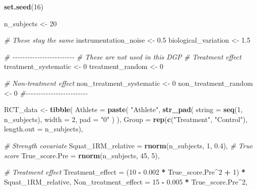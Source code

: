 \documentclass[
]{book}
\newenvironment{Shaded}{\begin{snugshade}}{\end{snugshade}}
\newcommand{\CommentTok}[1]{\textcolor[rgb]{0.56,0.35,0.01}{\textit{#1}}}
\newcommand{\DataTypeTok}[1]{\textcolor[rgb]{0.13,0.29,0.53}{#1}}
\newcommand{\DecValTok}[1]{\textcolor[rgb]{0.00,0.00,0.81}{#1}}
\newcommand{\FloatTok}[1]{\textcolor[rgb]{0.00,0.00,0.81}{#1}}
\newcommand{\KeywordTok}[1]{\textcolor[rgb]{0.13,0.29,0.53}{\textbf{#1}}}
\newcommand{\NormalTok}[1]{#1}
\newcommand{\OperatorTok}[1]{\textcolor[rgb]{0.81,0.36,0.00}{\textbf{#1}}}
\newcommand{\StringTok}[1]{\textcolor[rgb]{0.31,0.60,0.02}{#1}}
\begin{document}
\begin{Shaded}
\begin{Highlighting}[]
\KeywordTok{set.seed}\NormalTok{(}\DecValTok{16}\NormalTok{)}

\NormalTok{n\_subjects <{-}}\StringTok{ }\DecValTok{20}

\CommentTok{\# These stay the same}
\NormalTok{instrumentation\_noise <{-}}\StringTok{ }\FloatTok{0.5}
\NormalTok{biological\_variation <{-}}\StringTok{ }\FloatTok{1.5}

\CommentTok{\# {-}{-}{-}{-}{-}{-}{-}{-}{-}{-}{-}{-}{-}{-}{-}{-}{-}{-}{-}{-}{-}{-}{-}{-}{-}}
\CommentTok{\# These are not used in this DGP}
\CommentTok{\# Treatment effect}
\NormalTok{treatment\_systematic <{-}}\StringTok{ }\DecValTok{0}
\NormalTok{treatment\_random <{-}}\StringTok{ }\DecValTok{0}

\CommentTok{\# Non{-}treatment effect}
\NormalTok{non\_treatment\_systematic <{-}}\StringTok{ }\DecValTok{0}
\NormalTok{non\_treatment\_random <{-}}\StringTok{ }\DecValTok{0}
\CommentTok{\#{-}{-}{-}{-}{-}{-}{-}{-}{-}{-}{-}{-}{-}{-}{-}{-}{-}{-}{-}{-}{-}{-}{-}{-}{-}}

\NormalTok{RCT\_data <{-}}\StringTok{ }\KeywordTok{tibble}\NormalTok{(}
  \DataTypeTok{Athlete =} \KeywordTok{paste}\NormalTok{(}
    \StringTok{"Athlete"}\NormalTok{,}
    \KeywordTok{str\_pad}\NormalTok{(}
      \DataTypeTok{string =} \KeywordTok{seq}\NormalTok{(}\DecValTok{1}\NormalTok{, n\_subjects),}
      \DataTypeTok{width =} \DecValTok{2}\NormalTok{,}
      \DataTypeTok{pad =} \StringTok{"0"}
\NormalTok{    )}
\NormalTok{  ),}
  \DataTypeTok{Group =} \KeywordTok{rep}\NormalTok{(}\KeywordTok{c}\NormalTok{(}\StringTok{"Treatment"}\NormalTok{, }\StringTok{"Control"}\NormalTok{), }\DataTypeTok{length.out =}\NormalTok{ n\_subjects),}

  \CommentTok{\# Strength covariate}
  \DataTypeTok{Squat\_1RM\_relative =} \KeywordTok{rnorm}\NormalTok{(n\_subjects, }\DecValTok{1}\NormalTok{, }\FloatTok{0.4}\NormalTok{),}
  \CommentTok{\# True score}
  \DataTypeTok{True\_score.Pre =} \KeywordTok{rnorm}\NormalTok{(n\_subjects, }\DecValTok{45}\NormalTok{, }\DecValTok{5}\NormalTok{),}

  \CommentTok{\# Treatment effect}
  \DataTypeTok{Treatment\_effect =}\NormalTok{ (}\DecValTok{10} \OperatorTok{{-}}\StringTok{ }\FloatTok{0.002} \OperatorTok{*}\StringTok{ }\NormalTok{True\_score.Pre}\OperatorTok{\^{}}\DecValTok{2} \OperatorTok{+}\StringTok{ }\DecValTok{1}\NormalTok{) }\OperatorTok{*}\StringTok{ }\NormalTok{Squat\_1RM\_relative,}
  \DataTypeTok{Non\_treatment\_effect =} \DecValTok{15} \OperatorTok{{-}}\StringTok{ }\FloatTok{0.005} \OperatorTok{*}\StringTok{ }\NormalTok{True\_score.Pre}\OperatorTok{\^{}}\DecValTok{2}\NormalTok{,}


\end{Highlighting}
\end{Shaded}
\end{document}
